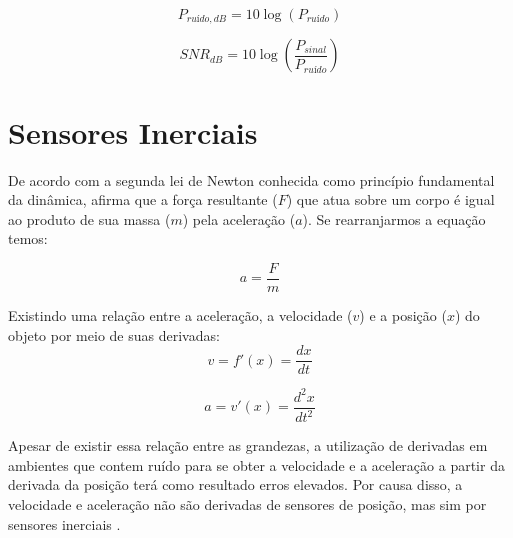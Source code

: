 \begin{equation}
    P_{ruído,dB}=10 \log(P_{ruído})
\end{equation}



\begin{equation}
   SNR_{dB} = 10 \log(\frac{P_{sinal}}{P_{ruído}} )
\end{equation}
















\newpage



\section {Sensores Inerciais}


 De acordo com a segunda lei de Newton conhecida como princípio fundamental da dinâmica, afirma que a força resultante ($ F $) que atua sobre um corpo é igual ao produto de sua massa ($m$) pela aceleração ($a$). Se rearranjarmos a equação temos:
 
 \begin{equation}
    a = \frac{F}{m}
\end{equation}
 
 Existindo uma relação entre a aceleração, a velocidade ($v$) e a posição ($x$) do objeto por meio de suas derivadas:
  \begin{equation}
    v = f'(x) = \frac{dx}{dt}
\end{equation} 

  \begin{equation}
    a = v'(x) = \frac{d^2x}{dt^2}
\end{equation} 
 
 Apesar de existir essa relação entre as grandezas, a utilização de derivadas em ambientes que contem ruído para se obter a velocidade e a aceleração a partir da derivada da posição terá como resultado erros elevados. Por causa disso, a velocidade e aceleração não são derivadas de sensores de posição, mas sim por sensores inerciais \cite[380]{ModernSensors}.



